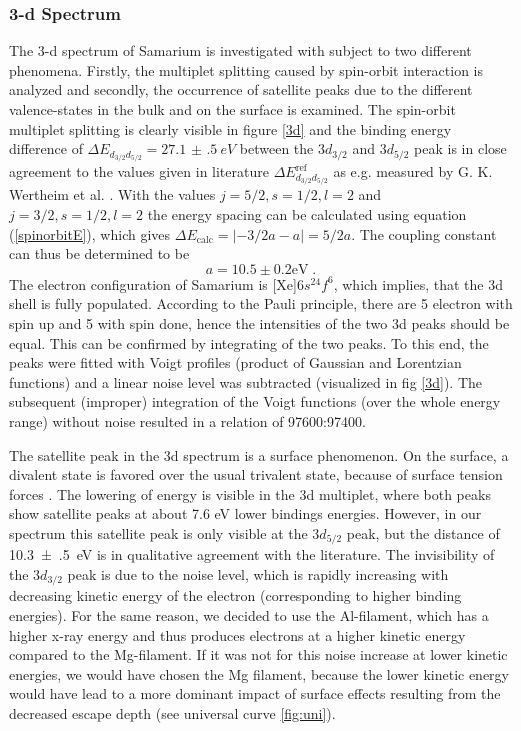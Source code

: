 \documentclass[a4paper]{scrartcl}
\numberwithin{equation}{section}
\numberwithin{figure}{section}
\numberwithin{table}{section}
\newcommand{\eq}[2]{\begin{equation}#1\label{#2}\end{equation}}
\newcommand{\Formel}[1]{(\ref{#1})}
\begin{document}
\FloatBarrier
\subsubsection{3-d Spectrum}
The 3-d spectrum of Samarium is investigated with subject to two different phenomena. Firstly, the multiplet splitting caused by spin-orbit interaction is analyzed and secondly, the occurrence of satellite peaks due to the different valence-states in the bulk and on the surface is examined. The spin-orbit multiplet splitting is clearly visible in figure \ref{3d} and the binding energy difference of $\Delta E_{d_{3/2}d_{5/2}} = \SI{27.1(5)}{eV}$ between the $3d_{3/2}$ and $3d_{5/2}$ peak is in close agreement to the values given in literature $\Delta E_{d_{3/2}d_{5/2}}^{\text{ref}}$ as e.g. measured by  G. K. Wertheim et al. \cite{wertheim}. With the values ${j=5/2, s=1/2, l=2}$ and ${j=3/2, s=1/2, l=2}$ the energy spacing can be calculated using equation \Formel{spinorbitE}, which gives $\Delta E_\text{calc}=\lvert-3/2 a - a \rvert=5/2 a$. The coupling constant can thus be determined to be 
\eq{a=10.5\pm 0.2\text{eV} \; .}{a}
The electron configuration of Samarium is [Xe]$6s^24f^6$, which implies, that the 3d shell is fully populated. According to the Pauli principle, there are 5 electron with spin up and 5 with spin done, hence the intensities of the two 3d peaks should be equal. This can be confirmed by integrating of the two peaks. To this end, the peaks were fitted with Voigt profiles (product of Gaussian and Lorentzian functions) and a linear noise level was subtracted (visualized in fig \ref{3d}). The subsequent (improper) integration of the Voigt functions (over the whole energy range) without noise resulted in a relation of 97600:97400.

The satellite peak in the 3d spectrum is a surface phenomenon. On the surface, a divalent state is favored over the usual trivalent state, because of surface tension forces  \cite{johansson}. The lowering of energy is visible in the 3d multiplet, where both peaks show satellite peaks at about 7.6 eV \cite{wertheim} lower bindings energies. However, in our spectrum this satellite peak is only visible at the $3d_{5/2}$ peak, but the distance of \SI{10.3(5)}{eV} is in qualitative agreement with the literature. The invisibility of the $3d_{3/2}$ peak is due to the noise level, which is rapidly increasing with decreasing kinetic energy of the electron (corresponding to higher binding energies). For the same reason, we decided to use the Al-filament, which has a higher x-ray energy and thus produces electrons at a higher kinetic energy compared to the Mg-filament. If it was not for this noise increase at lower kinetic energies, we would have chosen the Mg filament, because the lower kinetic energy would have lead to a more dominant impact of surface effects resulting from the decreased escape depth (see universal curve \ref{fig:uni}).
\end{document}
